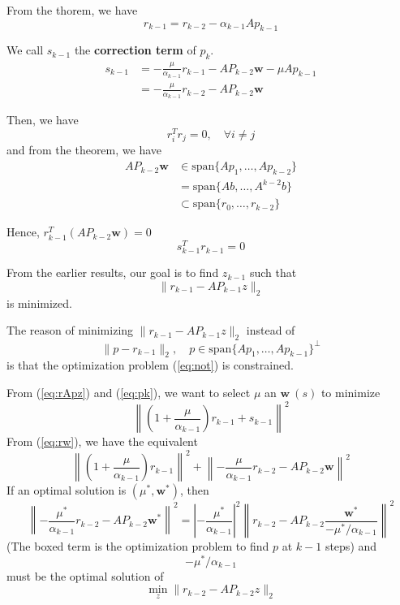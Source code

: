 From the thorem, we have \[
    r_{k-1} = r_{k-2} - \alpha_{k-1} A p_{k-1}
\]

\begin{definition}
    We call $s_{k-1}$ the \textbf{correction term} of $p_k$. \begin{equation}
        \begin{split}
        s_{k-1}
        & =
        -\frac{\mu}{\alpha_{k-1}} r_{k-1}
        - AP_{k-2}\mathbf{w}
        - \mu A p_{k-1}\\
        &
        = -\frac{\mu}{\alpha_{k-1}} r_{k-2}
        - AP_{k-2}\mathbf{w}  
        \end{split}
        \label{eq:sk-1}
    \end{equation}
\end{definition}

Then, we have \[
    r_i^T r_{j} = 0, \quad \forall i \neq j
\]
and from the theorem, we have \begin{equation*}
  \begin{split}
    AP_{k-2}\mathbf{w} & \in
    \text{span}\{Ap_1, \ldots,  A p_{k-2}\} \\
    & =     \text{span}\{Ab, \ldots,  A^{k-2}b\}\\
& \subset
\text{span}\{r_0, \ldots, r_{k-2}\}
\end{split}
\end{equation*}

Hence, $r_{k-1}^T (AP_{k-2}\mathbf{w}) = 0$
\begin{equation}
    s_{k-1}^T r_{k-1} = 0 \label{eq:rw}
\end{equation}

\begin{recall}
    From the earlier results, our goal is to find $z_{k-1}$ such that \[
        \| r_{k-1} - A P_{k-1} z\|_2
    \]
    is minimized.
\end{recall}

The reason of minimizing $\| r_{k-1} - A P_{k-1} z\|_2$ instead of \begin{equation}
    \| p - r_{k-1} \|_2, \quad p \in \mbox{span}\{Ap_1, \ldots, Ap_{k-1}\}^\perp \label{eq:not}
\end{equation}
is that the optimization problem (\ref{eq:not}) is constrained.

From (\ref{eq:rApz}) and (\ref{eq:pk}), we want to select $\mu$ an $\mathbf{w}\ (s)$ to minimize \[
    \left\| \left( 1 + \frac{\mu}{\alpha_{k-1}} \right) r_{k-1} + s_{k-1} \right\|^2
\]
From (\ref{eq:rw}), we have the equivalent \[
    \left\| \left( 1 + \frac{\mu}{\alpha_{k-1}} \right) r_{k-1} \right\|^2 + \left\| - \frac{\mu}{\alpha_{k-1}} r_{k-2} - AP_{k-2}\mathbf{w} \right\|^2
\]
If an optimal solution is $(\mu^*, \mathbf{w}^*)$, then \[
    \left\| - \frac{\mu^*}{\alpha_{k-1}} r_{k-2} - AP_{k-2}\mathbf{w}^* \right\|^2 = \left| -\frac{\mu^*}{\alpha_{k-1}} \right|^2 \left\| r_{k-2} - AP_{k-2} \boxed{\frac{\mathbf{w}^*}{-\mu^* / \alpha_{k-1}}} \right\|^2
\]
(The boxed term is the optimization problem to find $p$ at $k-1$ steps) and \[
    -\mu^* / \alpha_{k-1}
\]
must be the optimal solution of \[
    \min_{z} \|r_{k-2} - A P_{k-2} z\|_2
\]

